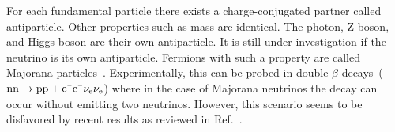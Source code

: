 
For each fundamental particle there exists a charge-conjugated partner called antiparticle. Other properties such as mass are identical. The photon, Z boson, and Higgs boson are their own antiparticle. It is still under investigation if the neutrino is its own antiparticle. Fermions with such a property are called Majorana particles~\cite{Majorana2006}. Experimentally, this can be probed in double $\beta$ decays~($\mathrm{nn}\to\mathrm{pp}+\mathrm{e}^{\rmminus}\mathrm{e}^{\rmminus}\nu_\mathrm{e}\nu_\mathrm{e}$) where in the case of Majorana neutrinos the decay can occur without emitting two neutrinos. However, this scenario seems to be disfavored by recent results as reviewed in Ref.~\cite{Dell'Oro:2016dbc}.


